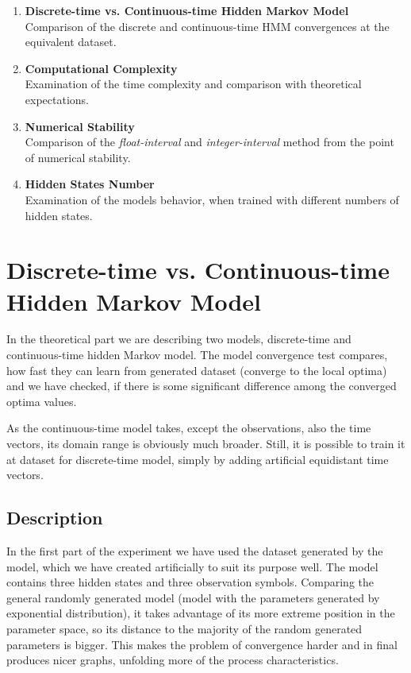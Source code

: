 \documentclass[thesis=M,english]{FITthesis}[2012/10/20]
\begin{document}
\begin{enumerate}[resume]
\setcounter{enumi}{0}
\item \textbf{Discrete-time vs. Continuous-time Hidden Markov Model} \\
Comparison of the discrete and continuous-time HMM convergences at the equivalent dataset.
\item \textbf{Computational Complexity} \\
Examination of the time complexity and comparison with theoretical expectations.
\item \textbf{Numerical Stability} \\
Comparison of the \textit{float-interval} and \textit{integer-interval} method from the point of numerical stability.
\item \textbf{Hidden States Number} \\
Examination of the models behavior, when trained with different numbers of hidden states.

\end{enumerate}


\section{Discrete-time vs. Continuous-time Hidden Markov Model}

In the theoretical part we are describing two models, discrete-time and continuous-time hidden Markov model. The model convergence test compares, how fast they can learn from generated dataset (converge to the local optima) and we have checked, if there is some significant difference among the converged optima values. 

As the continuous-time model takes, except the observations, also the time vectors, its domain range is obviously much broader. Still, it is possible to train it at dataset for discrete-time model, simply by adding artificial equidistant time vectors.

\subsection*{ Description }

In the first part of the experiment we have used the dataset generated by the model, which we have created artificially to suit its purpose well. %
The model contains three hidden states and three observation symbols. Comparing the general randomly generated model (model with the parameters generated by exponential distribution), it takes advantage of its more extreme position in the parameter space, so its distance to the majority of the random generated parameters is bigger. This makes the problem of convergence harder and in final produces nicer graphs, unfolding more of the process characteristics.
\end{document}
